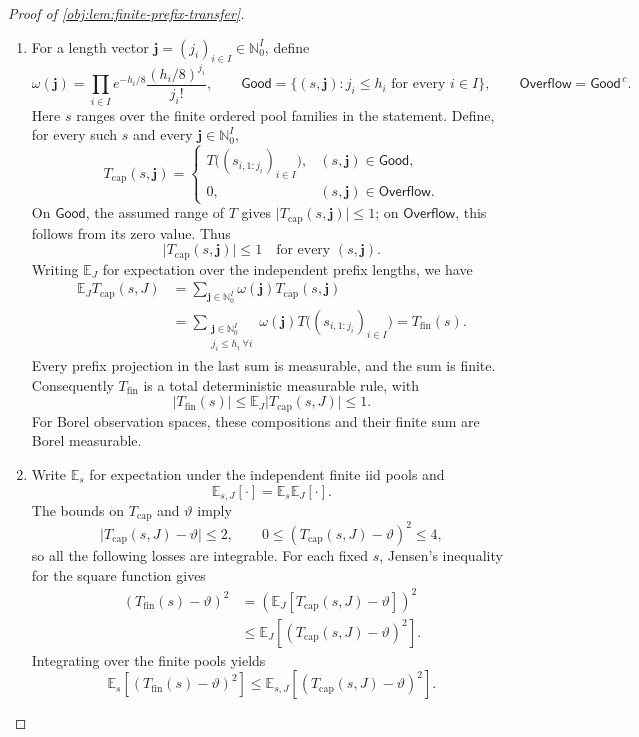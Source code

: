 \begin{proof}[Proof of \cref{obj:lem:finite-prefix-transfer}]
\begin{enumerate}
\item For a length vector \(\mathbf j=(j_i)_{i\in I}\in\mathbb N_0^I\), define
\begingroup\small
\[
\omega(\mathbf j)
=
\prod_{i\in I}
e^{-h_i/8}\frac{(h_i/8)^{j_i}}{j_i!},
\qquad
\mathsf{Good}
=
\{(s,\mathbf j):j_i\le h_i\text{ for every }i\in I\},
\qquad
\mathsf{Overflow}=\mathsf{Good}^{\,c}.
\]
\endgroup
Here \(s\) ranges over the finite ordered pool families in the statement. Define, for every such \(s\) and every \(\mathbf j\in\mathbb N_0^I\),
\[
T_{\mathrm{cap}}(s,\mathbf j)
=
\begin{cases}
T\bigl((s_{i,1:j_i})_{i\in I}\bigr),
   &(s,\mathbf j)\in\mathsf{Good},\\
0,&(s,\mathbf j)\in\mathsf{Overflow}.
\end{cases}
\]
On \(\mathsf{Good}\), the assumed range of \(T\) gives
\(\lvert T_{\mathrm{cap}}(s,\mathbf j)\rvert\le1\); on
\(\mathsf{Overflow}\), this follows from its zero value. Thus
\[
\lvert T_{\mathrm{cap}}(s,\mathbf j)\rvert\le1
\quad\text{for every }(s,\mathbf j).
\]
Writing \(\mathbb E_J\) for expectation over the independent prefix lengths, we have
\[
\begin{aligned}
\mathbb E_J T_{\mathrm{cap}}(s,J)
&=
\sum_{\mathbf j\in\mathbb N_0^I}
\omega(\mathbf j)T_{\mathrm{cap}}(s,\mathbf j)\\
&=
\sum_{\substack{\mathbf j\in\mathbb N_0^I\\j_i\le h_i\ \forall i}}
\omega(\mathbf j)
T\bigl((s_{i,1:j_i})_{i\in I}\bigr)
=
T_{\mathrm{fin}}(s).
\end{aligned}
\]
Every prefix projection in the last sum is measurable, and the sum is finite. Consequently \(T_{\mathrm{fin}}\) is a total deterministic measurable rule, with
\[
\lvert T_{\mathrm{fin}}(s)\rvert
\le
\mathbb E_J\lvert T_{\mathrm{cap}}(s,J)\rvert
\le1.
\]
For Borel observation spaces, these compositions and their finite sum are Borel measurable. %

\item Write \(\mathbb E_s\) for expectation under the independent finite iid pools and
\[
\mathbb E_{s,J}[\cdot]=\mathbb E_s\mathbb E_J[\cdot].
\]
The bounds on \(T_{\mathrm{cap}}\) and \(\vartheta\) imply
\[
\lvert T_{\mathrm{cap}}(s,J)-\vartheta\rvert\le2,
\qquad
0\le(T_{\mathrm{cap}}(s,J)-\vartheta)^2\le4,
\]
so all the following losses are integrable. For each fixed \(s\), Jensen's inequality for the square function gives
\[
\begin{aligned}
(T_{\mathrm{fin}}(s)-\vartheta)^2
&=
\left(\mathbb E_J[T_{\mathrm{cap}}(s,J)-\vartheta]\right)^2\\
&\le
\mathbb E_J[(T_{\mathrm{cap}}(s,J)-\vartheta)^2].
\end{aligned}
\]
Integrating over the finite pools yields
\[
\mathbb E_s[(T_{\mathrm{fin}}(s)-\vartheta)^2]
\le
\mathbb E_{s,J}[(T_{\mathrm{cap}}(s,J)-\vartheta)^2].
\] %


\end{enumerate}
\end{proof}
